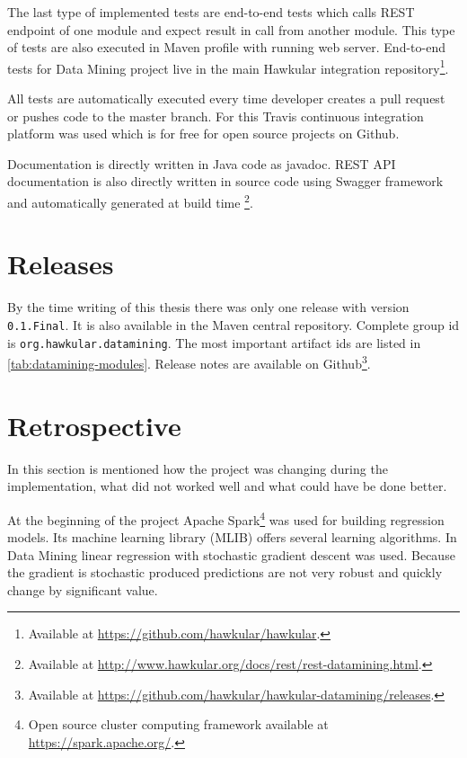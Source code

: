     The last type of implemented tests are end-to-end tests which calls REST endpoint of one module and expect result
    in call from another module. This type of tests are also executed in Maven profile with running web server.
    End-to-end tests for Data Mining project live in the main Hawkular integration repository\footnote{
    Available at \url{https://github.com/hawkular/hawkular}.}.

    All tests are automatically executed every time developer creates a pull request or pushes code to the master
    branch. For this Travis continuous integration platform was used which is for free for open source projects on
    Github.

    Documentation is directly written in Java code as javadoc. REST API documentation is also directly
    written in source code using Swagger framework and automatically generated at build time
    \footnote{Available at \url{http://www.hawkular.org/docs/rest/rest-datamining.html}.}.

    \section{Releases}
    By the time writing of this thesis there was only one release with version \texttt{0.1.Final}. It is also available
    in the Maven central repository. Complete group id is \texttt{org.hawkular.datamining}. The most important
    artifact ids are listed in \ref{tab:datamining-modules}. Release notes are available on
    Github\footnote{Available at \url{https://github.com/hawkular/hawkular-datamining/releases}.}.

    \section{Retrospective}
    In this section is mentioned how the project was changing during the implementation, what did not worked well and
    what could have be done better.

    At the beginning of the project Apache Spark\footnote{Open source cluster computing framework available at
    \url{https://spark.apache.org/}.} was used for building regression models. Its machine learning library (MLIB)
    offers several learning algorithms. In Data Mining linear regression with stochastic gradient descent was used.
    Because the gradient is stochastic produced predictions are not very robust and quickly change by significant value.

